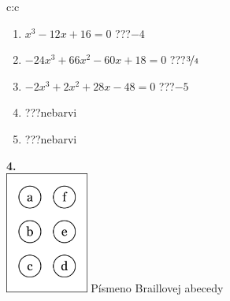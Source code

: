 \documentclass[10pt]{report}
\begin{document}
\begin{tabular}{c:c}
\begin{minipage}[c][104.5mm][t]{0.5\linewidth}
\begin{center}
\begin{minipage}{0.79\linewidth}
\begin{center}
\begin{varwidth}{\linewidth}
\begin{enumerate}
\item $x^3-12x+16=0$\quad \dotfill\; ???\;\dotfill \quad $-4$
\item $-24x^3+66x^2-60x+18=0$\quad \dotfill\; ???\;\dotfill \quad $\nicefrac{3}{4}$
\item $-2x^3+2x^2+28x-48=0$\quad \dotfill\; ???\;\dotfill \quad $-5$
\item \quad \dotfill\; ???\;\dotfill \quad nebarvi
\item \quad \dotfill\; ???\;\dotfill \quad nebarvi
\end{enumerate}
\end{varwidth}
\end{center}
\end{minipage}
\begin{minipage}{0.20\linewidth}
\begin{center}
{\Huge\bfseries 4.} \\[2mm]
\includegraphics[height=40mm]{../images/braille.png}
{\small Písmeno Braillovej abecedy}
\end{center}
\end{minipage}
\end{center}
\end{minipage}
%
\end{tabular}
\newpage
\thispagestyle{empty}
\end{document}
